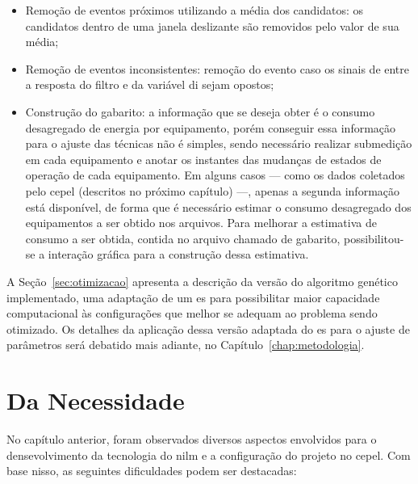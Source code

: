 \begin{itemize}
\item Remoção de eventos próximos utilizando a média dos candidatos:
os candidatos dentro de uma janela deslizante são removidos pelo valor
de sua média;
\item Remoção de eventos inconsistentes: remoção do evento caso os
sinais de entre a resposta do filtro e da variável \acs{di} sejam
opostos;
\item Construção do gabarito: a informação que se deseja obter é o
consumo desagregado de energia por equipamento, porém conseguir essa 
informação para o ajuste das técnicas não é simples, sendo necessário
realizar submedição em cada equipamento e anotar os instantes das
mudanças de estados de operação de cada equipamento. Em alguns casos
--- como os dados coletados pelo \acs{cepel} (descritos no próximo
capítulo) ---, apenas a segunda informação está disponível, de forma
que é necessário estimar o consumo desagregado dos equipamentos a ser
obtido nos arquivos. Para melhorar a estimativa de consumo a ser
obtida, contida no arquivo chamado de gabarito, possibilitou-se a
interação gráfica para a construção dessa estimativa.
\end{itemize}

A Seção~\ref{sec:otimizacao} apresenta a descrição da versão do
algoritmo genético implementado, uma adaptação de um \gls{es} para
possibilitar maior capacidade computacional às configurações que
melhor se adequam ao problema sendo otimizado. Os detalhes da
aplicação dessa versão adaptada do \gls{es} para o ajuste de
parâmetros será debatido mais adiante, no
Capítulo~\ref{chap:metodologia}.

\section{Da Necessidade}
\label{sec:motivacao_framework}

No capítulo anterior, foram observados diversos aspectos envolvidos
para o densevolvimento da tecnologia do \gls{nilm} e a configuração do
projeto no \gls{cepel}. Com base nisso, as seguintes dificuldades
podem ser destacadas:

